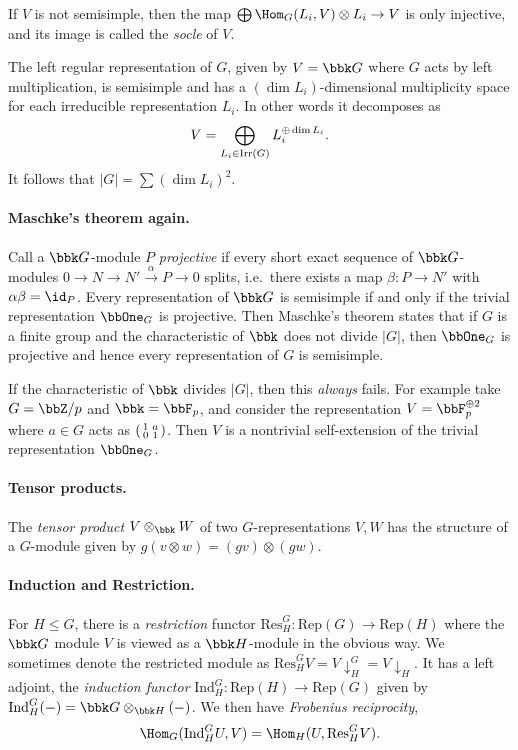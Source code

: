 If $V$ is not semisimple, then the map $\bigoplus \Hom_G(L_i,V)\otimes L_i\to V$
is only injective, and its image is called the \emph{socle} of $V$.

\begin{proposition}
    The left regular representation of $G$, given by $V=\bbk G$ where $G$ acts by left
    multiplication, is semisimple and has a $(\dim L_i)$-dimensional
    multiplicity space for each irreducible representation $L_i$. In other words
    it decomposes as \[V=\bigoplus_{L_i\in \textnormal{Irr}(G)} L_i^{\oplus \dim
    L_i}.\]
    It follows that $|G|=\sum (\dim L_i)^2$.
\end{proposition}

\paragraph{Maschke's theorem again.} Call a $\bbk G$-module $P$
\emph{projective} if every short exact sequence of $\bbk G$-modules $0\to N\to
N'\xrightarrow{\alpha} P\to 0$ splits, i.e.\ there exists a map $\beta\colon
P\to N'$ with $\alpha\beta = \id_P$. Every representation of $\bbk G$ is
semisimple if and only if the trivial representation $\bbOne_G$ is projective.
Then Maschke's theorem states that if $G$ is a finite group and the
characteristic of $\bbk$ does not divide $|G|$, then $\bbOne_G$ is projective
and hence every representation of $G$ is semisimple.

\begin{remark}
    If the characteristic of $\bbk$ divides $|G|$, then this \emph{always}
    fails. For example take $G=\bbZ/p$ and $\bbk = \bbF_p$, and consider the
    representation $V=\bbF_p^{\oplus 2}$ where $a\in G$ acts as
    $\left(\begin{smallmatrix} 1&a\\0&1 \end{smallmatrix}\right)$. Then $V$ is a nontrivial self-extension of the trivial
    representation $\bbOne_G$.
\end{remark}

\paragraph{Tensor products.} The \emph{tensor product} $V\otimes_\bbk
W$ of two $G$-representations $V,W$ has the structure of a $G$-module given by
$g(v\otimes w)=(gv) \otimes (gw)$. 

\paragraph{Induction and Restriction.} For $H\leq G$, there is a
\emph{restriction} functor $\text{Res}^G_H\colon \text{Rep}(G)\to \text{Rep}(H)$
where the $\bbk G$ module $V$ is viewed as a $\bbk H$-module in the obvious way.
We sometimes denote the restricted module as $\text{Res}^G_H V =
V\!\downarrow^G_H = V\!\downarrow_H$. It has a left adjoint, the \emph{induction
functor} $\text{Ind}^G_H\colon \text{Rep}(H)\to \text{Rep}(G)$ given by
$\text{Ind}^G_H(-)=\bbk G\otimes_{\bbk H }(-)$. We then have \emph{Frobenius
reciprocity}, \[\Hom_G(\text{Ind}^G_H U, V)= \Hom_H(U, \text{Res}^G_H V).\]

